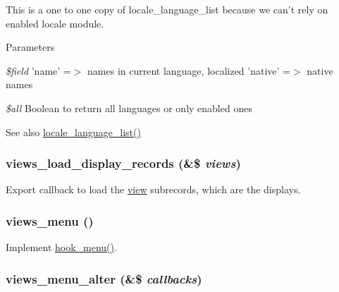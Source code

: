 This is a one to one copy of locale\_\-language\_\-list because we can't rely on enabled locale module.


\begin{DoxyParams}{Parameters}
\item[{\em \$field}]'name' =$>$ names in current language, localized 'native' =$>$ native names \item[{\em \$all}]Boolean to return all languages or only enabled ones\end{DoxyParams}
\begin{DoxySeeAlso}{See also}
\hyperlink{locale_8module_a744c64d4144758494d9e552375258a53}{locale\_\-language\_\-list()} 
\end{DoxySeeAlso}
\hypertarget{views_8module_a5ba50dc2afc437f2faf7d956d6488eb1}{
\subsubsection[{views\_\-load\_\-display\_\-records}]{\setlength{\rightskip}{0pt plus 5cm}views\_\-load\_\-display\_\-records (\&\$ {\em views})}}
\label{views_8module_a5ba50dc2afc437f2faf7d956d6488eb1}
Export callback to load the \hyperlink{classview}{view} subrecords, which are the displays. \hypertarget{views_8module_ab62ba1ad3afe80e5bf544339a6a690b6}{
\subsubsection[{views\_\-menu}]{\setlength{\rightskip}{0pt plus 5cm}views\_\-menu ()}}
\label{views_8module_ab62ba1ad3afe80e5bf544339a6a690b6}
Implement \hyperlink{group__hooks_ga5c95244fea59b25666e409759e133ded}{hook\_\-menu()}. \hypertarget{views_8module_a927f922bf3e583010e7deb46db1cbb4e}{
\subsubsection[{views\_\-menu\_\-alter}]{\setlength{\rightskip}{0pt plus 5cm}views\_\-menu\_\-alter (\&\$ {\em callbacks})}}
\label{views_8module_a927f922bf3e583010e7deb46db1cbb4e}
